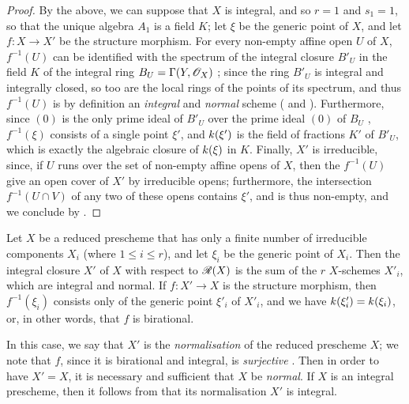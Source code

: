 \begin{proof}
By the above, we can suppose that $X$ is integral, and so $r=1$ and $s_1=1$, so that the unique algebra $A_1$ is a field $K$;
let $\xi$ be the generic point of $X$, and let $f:X\to X'$ be the structure morphism.
For every non-empty affine open $U$ of $X$, $f^{-1}(U)$ can be identified with the spectrum of the integral closure $B'_U$ in the field $K$ of the integral ring $B_U=\Gamma(Y,\mathscr{O}_X)$ ;
since the ring $B'_U$ is integral and integrally closed, so too are the local rings of the points of its spectrum, and thus $f^{-1}(U)$ is by definition an \emph{integral} and \emph{normal} scheme ( and ).
Furthermore, since $(0)$ is the only prime ideal of $B'_U$ over the prime ideal $(0)$ of $B_U$ \cite[t.~1, p.~259]{I-13}, $f^{-1}(\xi)$ consists of a single point $\xi'$, and $k(\xi')$ is the field of fractions $K'$ of $B'_U$, which is exactly the algebraic closure of $k(\xi)$ in $K$.
Finally, $X'$ is irreducible, since, if $U$ runs over the set of non-empty affine opens of $X$, then the $f^{-1}(U)$ give an open cover of $X'$ by irreducible opens;
furthermore, the intersection $f^{-1}(U\cap V)$ of any two of these opens contains $\xi'$, and is thus non-empty, and we conclude by .
\end{proof}

\begin{corollary}
Let $X$ be a reduced prescheme that has only a finite number of irreducible components $X_i$ (where $1\leq i\leq r$), and let $\xi_i$ be the generic point of $X_i$.
Then the integral closure $X'$ of $X$ with respect to $\mathscr{R}(X)$ is the sum of the $r$ $X$-schemes $X'_i$, which are integral and normal.
If $f:X'\to X$ is the structure morphism, then $f^{-1}(\xi_i)$ consists only of the generic point $\xi'_i$ of $X'_i$, and we have $k(\xi'_i)=k(\xi_i)$, or, in other words, that $f$ is birational.
\end{corollary}

In this case, we say that $X'$ is the \emph{normalisation} of the reduced prescheme $X$;
we note that $f$, since it is birational and integral, is \emph{surjective} .
Then in order to have $X'=X$, it is necessary and sufficient that $X$ be \emph{normal}.
If $X$ is an integral prescheme, then it follows from  that its normalisation $X'$ is integral.

